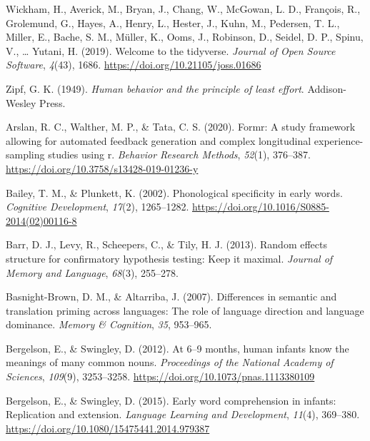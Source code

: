 \documentclass[
]{article}
\newlength{\cslhangindent}
\newlength{\cslentryspacingunit} %
\newenvironment{CSLReferences}[2] %
 {%
  \setlength{\parindent}{0pt}
  \ifodd #1
  \let\oldpar\par
  \def\par{\hangindent=\cslhangindent\oldpar}
  \fi
  \setlength{\parskip}{#2\cslentryspacingunit}
 }%
 {}
\begin{document}
\begin{CSLReferences}{1}{0}
\leavevmode{}%
Wickham, H., Averick, M., Bryan, J., Chang, W., McGowan, L. D.,
François, R., Grolemund, G., Hayes, A., Henry, L., Hester, J., Kuhn, M.,
Pedersen, T. L., Miller, E., Bache, S. M., Müller, K., Ooms, J.,
Robinson, D., Seidel, D. P., Spinu, V., \ldots{} Yutani, H. (2019).
Welcome to the tidyverse. \emph{Journal of Open Source Software},
\emph{4}(43), 1686. \url{https://doi.org/10.21105/joss.01686}

\leavevmode{}%
Zipf, G. K. (1949). \emph{Human behavior and the principle of least
effort}. Addison-Wesley Press.

\leavevmode{}%
Arslan, R. C., Walther, M. P., \& Tata, C. S. (2020). Formr: A study
framework allowing for automated feedback generation and complex
longitudinal experience-sampling studies using r. \emph{Behavior
Research Methods}, \emph{52}(1), 376--387.
\url{https://doi.org/10.3758/s13428-019-01236-y}

\leavevmode{}%
Bailey, T. M., \& Plunkett, K. (2002). Phonological specificity in early
words. \emph{Cognitive Development}, \emph{17}(2), 1265--1282.
\url{https://doi.org/10.1016/S0885-2014(02)00116-8}

\leavevmode{}%
Barr, D. J., Levy, R., Scheepers, C., \& Tily, H. J. (2013). Random
effects structure for confirmatory hypothesis testing: Keep it maximal.
\emph{Journal of Memory and Language}, \emph{68}(3), 255--278.

\leavevmode{}%
Basnight-Brown, D. M., \& Altarriba, J. (2007). Differences in semantic
and translation priming across languages: The role of language direction
and language dominance. \emph{Memory \& Cognition}, \emph{35}, 953--965.

\leavevmode{}%
Bergelson, E., \& Swingley, D. (2012). At 6--9 months, human infants
know the meanings of many common nouns. \emph{Proceedings of the
National Academy of Sciences}, \emph{109}(9), 3253--3258.
\url{https://doi.org/10.1073/pnas.1113380109}

\leavevmode{}%
Bergelson, E., \& Swingley, D. (2015). Early word comprehension in
infants: Replication and extension. \emph{Language Learning and
Development}, \emph{11}(4), 369--380.
\url{https://doi.org/10.1080/15475441.2014.979387}


\end{CSLReferences}
\end{document}
